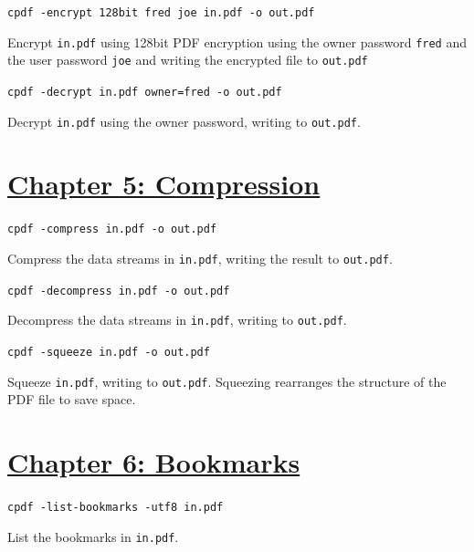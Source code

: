 \documentclass{book}
\begin{document}
\begin{framed}\noindent\texttt{cpdf -encrypt 128bit fred joe in.pdf -o out.pdf}\end{framed}

\noindent Encrypt \texttt{in.pdf} using 128bit PDF encryption using the owner password \texttt{fred} and the user password \texttt{joe} and writing the encrypted file to \texttt{out.pdf}

\begin{framed}\noindent\texttt{cpdf -decrypt in.pdf owner=fred -o out.pdf}\end{framed}

\noindent Decrypt \texttt{in.pdf} using the owner password, writing to \texttt{out.pdf}.


\section*{\hyperref[chap:5]{Chapter 5: Compression}}

\begin{framed}\noindent\texttt{cpdf -compress in.pdf -o out.pdf}\end{framed}

\noindent Compress the data streams in \texttt{in.pdf}, writing the result to \texttt{out.pdf}.

\begin{framed}\noindent\texttt{cpdf -decompress in.pdf -o out.pdf}\end{framed}

\noindent Decompress the data streams in \texttt{in.pdf}, writing to \texttt{out.pdf}.

\begin{framed}\noindent\texttt{cpdf -squeeze in.pdf -o out.pdf}\end{framed}

\noindent Squeeze \texttt{in.pdf}, writing to \texttt{out.pdf}. Squeezing rearranges the structure of the PDF file to save space.


\section*{\hyperref[chap:6]{Chapter 6: Bookmarks}}

\begin{framed}\noindent\texttt{cpdf -list-bookmarks -utf8 in.pdf}\end{framed}

\noindent List the bookmarks in \texttt{in.pdf}. 
\end{document}
